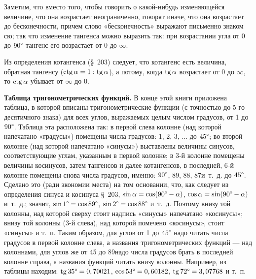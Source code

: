 \documentclass[oneside]{book}
\begin{document}
Заметим, что вместо того, чтобы говорить о какой-нибудь изменяющейся величине, что она возрастает неограниченно, говорят иначе, что она возрастает до бесконечности, причем слово «бесконечность» выражают письменно знаком сю;
так что изменение тангенса можно выразить так:
при возрастании угла от 0 до $90\degree$ тангенс его возрастает от 0 до $\infty$.

Из определения котангенса (§~203) следует, что котангенс есть величина, обратная тангенсу ($\mathrm{ctg}\,\alpha = 1 : \mathrm{tg}\,\alpha$), а потому, когда $\mathrm{tg}\,\alpha$ возрастает от 0 до $\infty$, то $\mathrm{ctg}\,\alpha$ убывает от $\infty$ до 0.

\textbf{Таблица тригонометрических функций.}
В конце этой книги приложена таблица, в которой вписаны тригонометрические функции (с точностью до 5-го десятичного знака) для всех углов, выражаемых целым числом градусов, от 1 до $90\degree$.
Таблица эта расположена так:
в первой слева колонне (над которой напечатано «градусы») помещены числа градусов:
1\degree , 2\degree , 3\degree , ...
до $45\degree$;
во второй колонне (над которой напечатано «синусы») выставлены величины синусов, соответствующие углам, указанным в первой колонне;
в 3-й колонне помещены величины косинусов, затем тангенсов и далее котангенсов, в последней, 6-й колонне помещены снова числа градусов, именно:
$90\degree$, 89\degree , 88\degree , 87\degree и~т.~д.
до $45\degree$.
Сделано это (ради экономии места) на том основании, что, как следует из определения синуса и косинуса §~203, $\sin\alpha=\cos(90\degree-\alpha)$, $\cos\alpha=\sin(90\degree-\alpha)$ и~т.~д.;
значит, $\sin1\degree = \cos 89\degree$, $\sin 2\degree = \cos 88\degree$ и~т.~д.
Поэтому внизу той колонны, над которой сверху стоит надпись «синусы» напечатано «косинусы»;
внизу той колонны (3-й слева), над которой помечено «косинусы», стоит «синусы» и т.~п.
Таким образом, для углов от 1 до $45\degree$ надо читать числа градусов в первой колонне слева, а названия тригонометрических функций — над колоннами, для углов же от 45 до 89\degree надо числа градусов брать в последней колонне справа, а названия функций читать внизу колонны.
Например, из таблицы находим:
$\mathrm{tg}\,35\degree = 0,70021$, $\cos 53\degree = 0,60182$, $\mathrm{tg}\,72\degree = 3,07768$ и т.~п.
\end{document}
